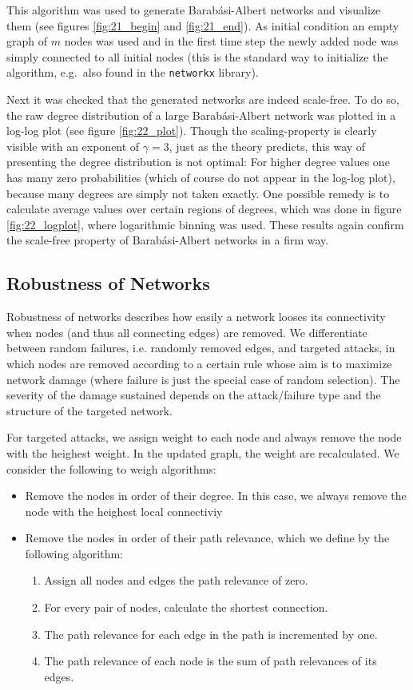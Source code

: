 \documentclass{scrartcl}
\begin{document}
 This algorithm was used to generate Barab\'asi-Albert
networks and visualize them (see figures \ref{fig:21_begin} and \ref{fig:21_end}).
As initial condition an empty graph of $m$ nodes was used and in the first
time step the newly added node was simply connected to all initial nodes
(this is the standard way to initialize the algorithm, e.g.\ also found in
the \texttt{networkx} library).

 Next it was checked that the generated networks are indeed scale-free.
To do so, the raw degree distribution of a large Barab\'asi-Albert network
was plotted in a log-log plot (see figure \ref{fig:22_plot}). Though the
scaling-property is clearly visible with an exponent of $\gamma = 3$, just
as the theory predicts, this way of presenting the degree distribution is
not optimal: For higher degree values one has many zero probabilities
(which of course do not appear in the log-log plot), because many degrees are
simply not taken exactly. One possible remedy is to calculate average
values over certain regions of degrees, which was done in figure
\ref{fig:22_logplot}, where logarithmic binning was used. These results
again confirm the scale-free property of Barab\'asi-Albert networks in a firm way.

\subsection{Robustness of Networks}
Robustness of networks describes how easily a network looses its connectivity when nodes (and thus all connecting edges) are removed. We differentiate between random failures, i.e. randomly removed edges, and targeted attacks, in which nodes are removed according to a certain rule whose aim is to maximize network damage (where failure is just the special case of random selection). The severity of the damage sustained depends on the attack/failure type and the structure of the targeted network. 

For targeted attacks, we assign weight to each node and always remove the node with the heighest weight. In the updated graph, the weight are recalculated. We consider the following to weigh algorithms:
\begin{itemize}
\item Remove the nodes in order of their degree. In this case, we always remove the node with the heighest local connectiviy
\item Remove the nodes in order of their path relevance, which we define by the following algorithm:
	\begin{enumerate}
	\item Assign all nodes and edges the path relevance of zero.
	\item For every pair of nodes, calculate the shortest connection.
	\item The path relevance for each edge in the path is incremented by one.
	\item The path relevance of each node is the sum of path relevances of its edges.
	\end{enumerate}
\end{itemize}
\end{document}
